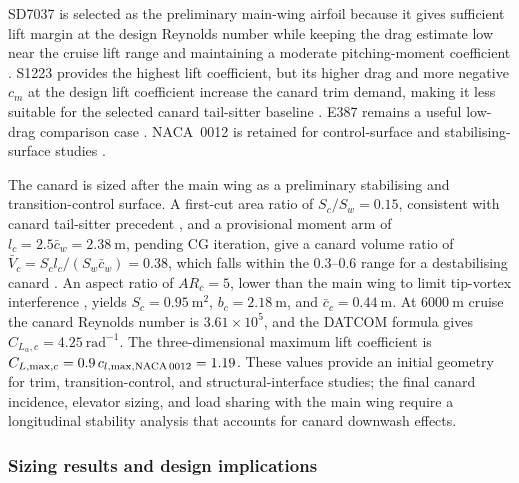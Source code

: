 SD7037 is selected as the preliminary main-wing airfoil because it gives
sufficient lift margin at the design Reynolds number while keeping the drag
estimate low near the cruise lift range and maintaining a moderate
pitching-moment coefficient \cite{SeligUIUCVol2, SeligUIUCVol3}. S1223
provides the highest lift coefficient, but its higher drag and more negative
\(c_m\) at the design lift coefficient increase the canard trim demand, making
it less suitable for the selected canard tail-sitter baseline
\cite{SeligGuglielmo1997}. E387 remains a useful low-drag comparison case
\cite{McGhee1988NASA}. NACA~0012 is retained for control-surface and
stabilising-surface studies \cite{AbbottVonDoenhoff1959}.

The canard is sized after the main wing as a preliminary stabilising and
transition-control surface. A first-cut area ratio of $S_c/S_w = 0.15$,
consistent with canard tail-sitter precedent \cite{Stone1999, Raymer2018},
and a provisional moment arm of $l_c = 2.5\bar{c}_w = 2.38~\mathrm{m}$,
pending CG iteration, give a canard volume ratio
of $\bar{V}_c = S_c l_c / (S_w \bar{c}_w) = 0.38$, which falls within the
$0.3$--$0.6$ range for a destabilising canard \cite{Raymer2018,
Roskam1985PartVI}. An aspect ratio of $AR_c = 5$, lower than the main wing
to limit tip-vortex interference \cite{Raymer2018,
Roskam1985PartVI}, yields $S_c = 0.95~\mathrm{m^2}$, $b_c = 2.18~\mathrm{m}$, and $\bar{c}_c = 0.44~\mathrm{m}$. At $6000~\mathrm{m}$ cruise the canard
Reynolds number is $3.61\times10^5$, and the DATCOM formula
\cite{Polhamus1958, USAFDATCOM1978} gives $C_{L_\alpha,c} =
4.25~\mathrm{rad^{-1}}$. The three-dimensional maximum lift coefficient is
$C_{L,\max,c} = 0.9\,c_{l,\max,\text{NACA\,0012}} = 1.19$. These values
provide an initial geometry for trim, transition-control, and
structural-interface studies; the final canard incidence, elevator sizing,
and load sharing with the main wing require a longitudinal stability analysis
that accounts for canard downwash effects.
  
 
\subsubsection{Sizing results and design implications}
 
